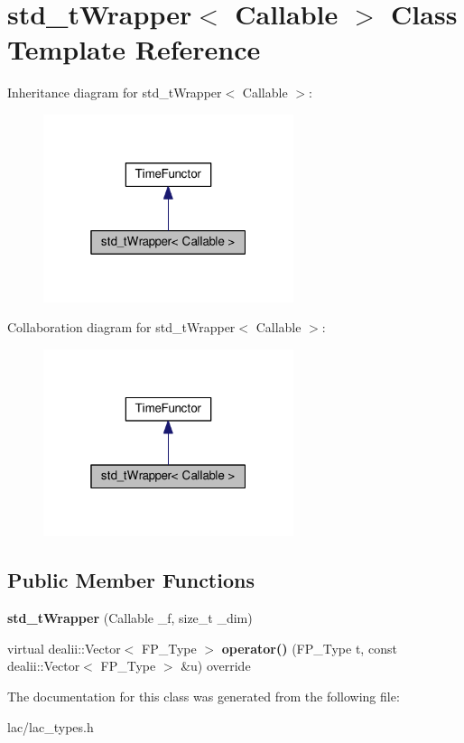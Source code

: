 \hypertarget{classstd__tWrapper}{}\section{std\+\_\+t\+Wrapper$<$ Callable $>$ Class Template Reference}
\label{classstd__tWrapper}


Inheritance diagram for std\+\_\+t\+Wrapper$<$ Callable $>$\+:\nopagebreak
\begin{figure}[H]
\begin{center}
\leavevmode
\includegraphics[width=208pt]{classstd__tWrapper__inherit__graph}
\end{center}
\end{figure}


Collaboration diagram for std\+\_\+t\+Wrapper$<$ Callable $>$\+:\nopagebreak
\begin{figure}[H]
\begin{center}
\leavevmode
\includegraphics[width=208pt]{classstd__tWrapper__coll__graph}
\end{center}
\end{figure}
\subsection*{Public Member Functions}
\begin{DoxyCompactItemize}
\item 
\mbox{\label{classstd__tWrapper_ae03dec41d5f1107b180cb3b5cd5a67ff}} 
{\bfseries std\+\_\+t\+Wrapper} (Callable \+\_\+f, size\+\_\+t \+\_\+dim)
\item 
\mbox{\label{classstd__tWrapper_ac2204320087cd5e84a58df0b35008075}} 
virtual dealii\+::\+Vector$<$ F\+P\+\_\+\+Type $>$ {\bfseries operator()} (F\+P\+\_\+\+Type t, const dealii\+::\+Vector$<$ F\+P\+\_\+\+Type $>$ \&u) override
\end{DoxyCompactItemize}


The documentation for this class was generated from the following file\+:\begin{DoxyCompactItemize}
\item 
lac/lac\+\_\+types.\+h\end{DoxyCompactItemize}
